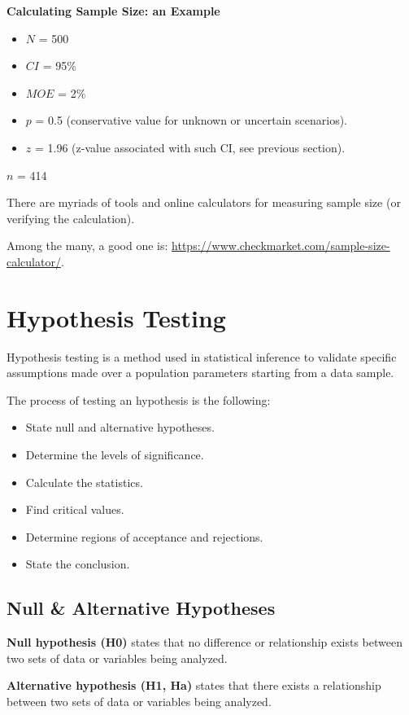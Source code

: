 \documentclass{article}
\begin{document}
\textbf{Calculating Sample Size: an Example}
\begin{itemize}
    \item $N$ = 500
    \item $CI$ = 95\%
    \item $MOE$ = 2\%
    \item $p$ = 0.5 (conservative value for unknown or uncertain scenarios).
    \item $z$ = 1.96 (z-value associated with such CI, see previous section).
\end{itemize}

$n$ = 414 

There are myriads of tools and online calculators for measuring sample size (or verifying the calculation). 

Among the many, a good one is: \url{https://www.checkmarket.com/sample-size-calculator/}. 

\clearpage

\section{Hypothesis Testing}
Hypothesis testing is a method used in statistical inference to validate specific assumptions made over a population parameters starting from a data sample. 

The process of testing an hypothesis is the following:
\begin{itemize}
    \item State null and alternative hypotheses.
    \item Determine the levels of significance.
    \item Calculate the statistics.
    \item Find critical values.
    \item Determine regions of acceptance and rejections.
    \item State the conclusion.
\end{itemize}

\subsection{Null \& Alternative Hypotheses}
\textbf{Null hypothesis (H0)} states that no difference or relationship exists between two sets of data or variables being analyzed. 

\textbf{Alternative hypothesis (H1, Ha)} states that there exists a relationship between two sets of data or variables being analyzed. 
\end{document}
